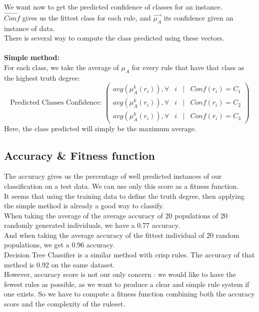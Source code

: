 \documentclass[a4paper,12pt]{article}
\begin{document}
We want now to get the predicted confidence of classes for an instance.\\
$\vec{Conf}$ gives us the fittest class for each rule, and $\vec{\mu_A}$ its confidence given an instance of data. \\
There is several way to compute the class predicted using these vectors.
\\
\\
\textbf{Simple method:}
\\
For each class, we take the average of $\mu_A$ for every rule that have that class as the highest truth degree:
\[
\text{Predicted Classes Confidence: }
\begin{pmatrix}
avg(\mu_A^k(r_i)), \forall & i & | & Conf(r_i)=C_1\\
avg(\mu_A^k(r_i)), \forall & i & | & Conf(r_i)=C_2\\
avg(\mu_A^k(r_i)), \forall & i & | & Conf(r_i)=C_3
\end{pmatrix}
\]
Here, the class predicted will simply be the maximum average.


\subsection{Accuracy \& Fitness function}

The accuracy gives us the percentage of well predicted instances of our classification on a test data. We can use only this score as a fitness function.\\
It seems that using the training data to define the truth degree, then applying the simple method is already a good way to classify.\\
When taking the average of the average accuracy of 20 populations of 20 randomly generated individuals, we have a 0.77 accuracy.\\
And when taking the average accuracy of the fittest individual of 20 random populations, we get a 0.96 accuracy.\\
Decision Tree Classifier is a similar method with crisp rules. The accuracy of that method is 0.92 on the same dataset.\\
However, accuracy score is not our only concern : we would like to have the fewest rules as possible, as we want to produce a clear and simple rule system if one exists. So we have to compute a fitness function combining both the accuracy score and the complexity of the ruleset.



\end{document}
